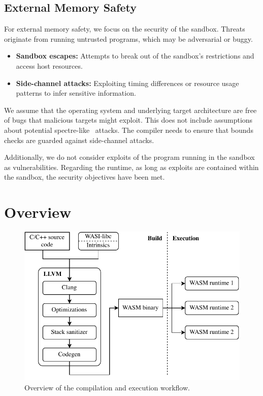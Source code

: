 \subsection{External Memory Safety}
\label{subsec:external-memory-safety}

For external memory safety, we focus on the security of the sandbox.
Threats originate from running untrusted programs, which may be adversarial or buggy.

\begin{itemize}
    \item \textbf{Sandbox escapes:} Attempts to break out of the sandbox's restrictions and access host resources.
    \item \textbf{Side-channel attacks:} Exploiting timing differences or resource usage patterns to infer sensitive information.
\end{itemize}

We assume that the operating system and underlying target architecture are free of bugs that malicious targets might exploit.
This does not include assumptions about potential spectre-like~\cite{kocher2020spectre} attacks.
The compiler needs to ensure that bounds checks are guarded against side-channel attacks.

Additionally, we do not consider exploits of the program running in the sandbox as vulnerabilities.
Regarding the runtime, as long as exploits are contained within the sandbox, the security objectives have been met.

\section{Overview}
\label{sec:overview}

\begin{figure}[t]
    \centering
    \includegraphics{figures/build/overview}
    \caption{Overview of the compilation and execution workflow.}
    \label{fig:overview}
\end{figure}


